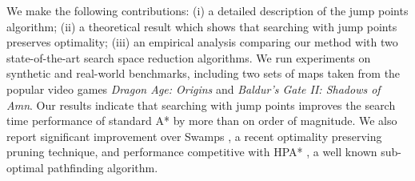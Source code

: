 We make the following contributions: (i) a detailed description of the jump
points algorithm; (ii) a theoretical result which shows that searching with jump
points preserves optimality;  (iii) an empirical analysis comparing our method
with two state-of-the-art search space reduction algorithms.  We run experiments
on synthetic and real-world benchmarks, including two sets of maps taken from
the popular video games \emph{Dragon Age: Origins} and \emph{Baldur's Gate II:
Shadows of Amn}.  Our results indicate that searching with jump points improves
the search time performance of standard A* by more than on order of magnitude.
We also report significant improvement over Swamps \cite{pochter10}, a recent
optimality preserving pruning technique, and performance competitive with HPA*
\cite{botea04}, a well known sub-optimal pathfinding algorithm.
